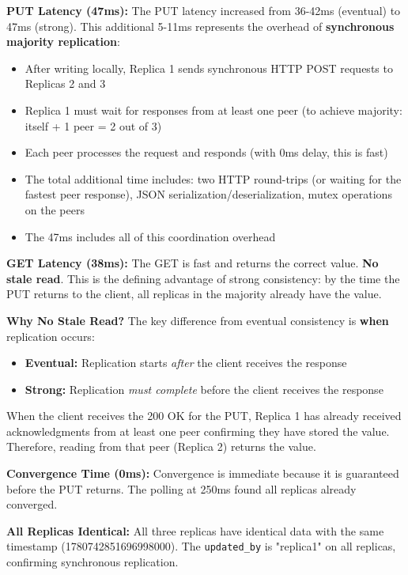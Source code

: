 \documentclass[10pt,a4paper]{article}
\begin{document}
\textbf{PUT Latency (47ms):} The PUT latency increased from 36-42ms (eventual) to 47ms (strong). This additional 5-11ms represents the overhead of \textbf{synchronous majority replication}:
\begin{itemize}
    \item After writing locally, Replica 1 sends synchronous HTTP POST requests to Replicas 2 and 3
    \item Replica 1 must wait for responses from at least one peer (to achieve majority: itself + 1 peer = 2 out of 3)
    \item Each peer processes the request and responds (with 0ms delay, this is fast)
    \item The total additional time includes: two HTTP round-trips (or waiting for the fastest peer response), JSON serialization/deserialization, mutex operations on the peers
    \item The 47ms includes all of this coordination overhead
\end{itemize}

\textbf{GET Latency (38ms):} The GET is fast and returns the correct value. \textbf{No stale read}. This is the defining advantage of strong consistency: by the time the PUT returns to the client, all replicas in the majority already have the value.

\textbf{Why No Stale Read?} The key difference from eventual consistency is \textbf{when} replication occurs:
\begin{itemize}
    \item \textbf{Eventual:} Replication starts \textit{after} the client receives the response
    \item \textbf{Strong:} Replication \textit{must complete} before the client receives the response
\end{itemize}

When the client receives the 200 OK for the PUT, Replica 1 has already received acknowledgments from at least one peer confirming they have stored the value. Therefore, reading from that peer (Replica 2) returns the value.

\textbf{Convergence Time (0ms):} Convergence is immediate because it is guaranteed before the PUT returns. The polling at 250ms found all replicas already converged.

\textbf{All Replicas Identical:} All three replicas have identical data with the same timestamp (1780742851696998000). The \texttt{updated\_by} is "replica1" on all replicas, confirming synchronous replication.
\end{document}
